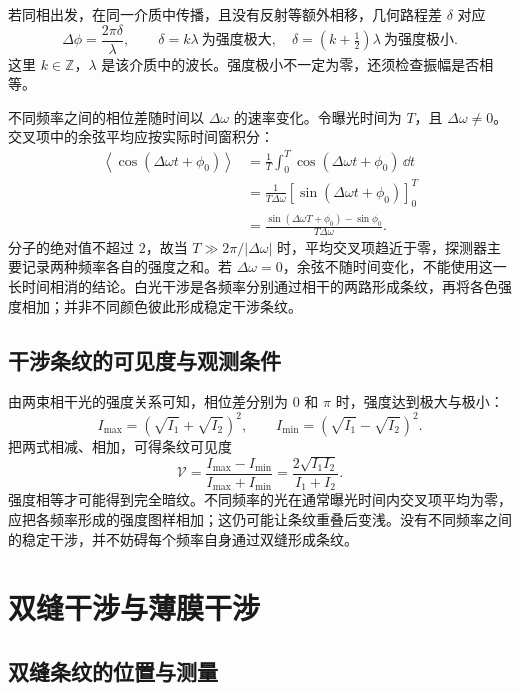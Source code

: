 若同相出发，在同一介质中传播，且没有反射等额外相移，几何路程差 $\delta$ 对应
\[
 \Delta\phi=\frac{2\pi\delta}{\lambda},\qquad
 \delta=k\lambda\ \text{为强度极大},\quad
 \delta=(k+\tfrac12)\lambda\ \text{为强度极小}.
\]
这里 $k\in\mathbb Z$，$\lambda$ 是该介质中的波长。强度极小不一定为零，还须检查振幅是否相等。

不同频率之间的相位差随时间以 $\Delta\omega$ 的速率变化。令曝光时间为 $T$，且 $\Delta\omega\ne0$。交叉项中的余弦平均应按实际时间窗积分：
\begin{align*}
\left\langle\cos(\Delta\omega t+\phi_0)\right\rangle
&=\frac1T\int_0^T\cos(\Delta\omega t+\phi_0)\,\dd t\\
&=\frac1{T\Delta\omega}
[\sin(\Delta\omega t+\phi_0)]_0^T\\
&=\frac{\sin(\Delta\omega T+\phi_0)-\sin\phi_0}{T\Delta\omega}.
\end{align*}
分子的绝对值不超过 $2$，故当 $T\gg2\pi/|\Delta\omega|$ 时，平均交叉项趋近于零，探测器主要记录两种频率各自的强度之和。若 $\Delta\omega=0$，余弦不随时间变化，不能使用这一长时间相消的结论。白光干涉是各频率分别通过相干的两路形成条纹，再将各色强度相加；并非不同颜色彼此形成稳定干涉条纹。

\subsection{干涉条纹的可见度与观测条件}
由两束相干光的强度关系可知，相位差分别为 $0$ 和 $\pi$ 时，强度达到极大与极小：
\[
 I_{\max}=(\sqrt{I_1}+\sqrt{I_2})^2,\qquad
 I_{\min}=(\sqrt{I_1}-\sqrt{I_2})^2.
\]
把两式相减、相加，可得条纹可见度
\[
 \mathcal V=\frac{I_{\max}-I_{\min}}{I_{\max}+I_{\min}}
 =\frac{2\sqrt{I_1I_2}}{I_1+I_2}.
\]
强度相等才可能得到完全暗纹。不同频率的光在通常曝光时间内交叉项平均为零，应把各频率形成的强度图样相加；这仍可能让条纹重叠后变浅。没有不同频率之间的稳定干涉，并不妨碍每个频率自身通过双缝形成条纹。



\section{双缝干涉与薄膜干涉}

\subsection{双缝条纹的位置与测量}

